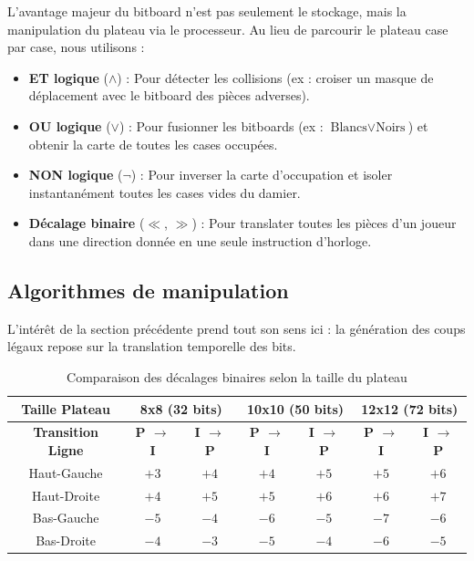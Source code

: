 \documentclass[a4paper]{article}
\begin{document}
L'avantage majeur du bitboard n'est pas seulement le stockage, mais la manipulation du plateau via le processeur. 
Au lieu de parcourir le plateau case par case, nous utilisons :
\begin{itemize}
  \item \textbf{ET logique} (\(\land\)) : Pour détecter les collisions (ex : croiser un masque de déplacement 
  avec le bitboard des pièces adverses).
  \item \textbf{OU logique} (\(\lor\)) : Pour fusionner les bitboards (ex : \(\text{Blancs} \lor \text{Noirs}\)) 
  et obtenir la carte de toutes les cases occupées.
  \item \textbf{NON logique} (\(\lnot\)) : Pour inverser la carte d'occupation et isoler instantanément toutes les 
  cases vides du damier.
  \item \textbf{Décalage binaire} (\(\ll\), \(\gg\)) : Pour translater toutes les pièces d'un joueur dans 
  une direction donnée en une seule instruction d'horloge.
\end{itemize}


\subsection{Algorithmes de manipulation}

L'intérêt de la section précédente prend tout son sens ici : la génération des coups légaux repose sur la translation 
temporelle des bits.

\begin{table}[!ht]
    \centering
    \caption{Comparaison des décalages binaires selon la taille du plateau}
    \label{tab:comparaison-offsets}
    \begin{tabular}{|c|c|c||c|c||c|c|}
        \hline
        \textbf{Taille Plateau} & \multicolumn{2}{c||}{\textbf{8x8 (32 bits)}} & \multicolumn{2}{c||}{\textbf{10x10 (50 bits)}} & \multicolumn{2}{c|}{\textbf{12x12 (72 bits)}} \\ \hline
        \textbf{Transition Ligne} & \textbf{P $\to$ I} & \textbf{I $\to$ P} & \textbf{P $\to$ I} & \textbf{I $\to$ P} & \textbf{P $\to$ I} & \textbf{I $\to$ P} \\ \hline
        Haut-Gauche & $+3$ & $+4$ & $+4$ & $+5$ & $+5$ & $+6$ \\ \hline
        Haut-Droite & $+4$ & $+5$ & $+5$ & $+6$ & $+6$ & $+7$ \\ \hline
        Bas-Gauche  & $-5$ & $-4$ & $-6$ & $-5$ & $-7$ & $-6$ \\ \hline
        Bas-Droite  & $-4$ & $-3$ & $-5$ & $-4$ & $-6$ & $-5$ \\ \hline
    \end{tabular}
\end{table}
\end{document}
